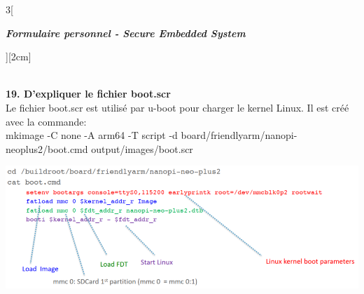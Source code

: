 \begin{multicols}{3}[\centerline{ \large\em \textbf{Formulaire personnel - Secure Embedded System}}][2cm]
\begin{minipage}{\linewidth}
\end{minipage}
\\ \textbf{19. D’expliquer le fichier boot.scr\\}
Le fichier boot.scr est utilisé par u-boot pour charger le
kernel Linux. Il est créé avec la commande:\\
mkimage -C none -A arm64 -T script -d board/friendlyarm/nanopi-neoplus2/boot.cmd output/images/boot.scr\\
\begin{minipage}{\linewidth}
	\centering
    \includegraphics[width =0.8\columnwidth]{images/12.png}
\end{minipage}
\columnbreak


\end{multicols}
